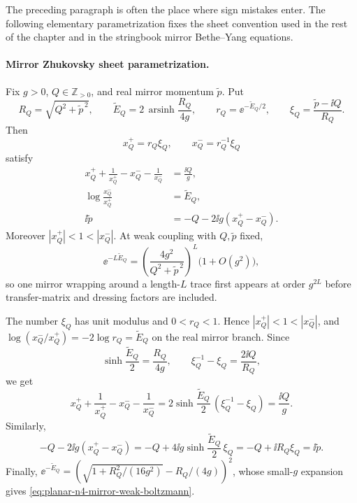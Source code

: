 The preceding paragraph is often the place where sign mistakes enter.  The
following elementary parametrization fixes the sheet convention used in the
rest of the chapter and in the stringbook mirror Bethe--Yang equations.

\paragraph{Mirror Zhukovsky sheet parametrization.}
Fix \(g>0\), \(Q\in\mathbb Z_{>0}\), and real mirror momentum
\(\widetilde p\).  Put
\[
  R_Q=\sqrt{Q^2+\widetilde p^{\,2}},
  \qquad
  \widetilde E_Q
  =
  2\,\operatorname{arsinh}\frac{R_Q}{4g},
  \qquad
  r_Q=\ee^{-\widetilde E_Q/2},
  \qquad
  \xi_Q=\frac{\widetilde p-\ii Q}{R_Q}.
\]
Then
\begin{equation}
  x_Q^+=r_Q\xi_Q,\qquad
  x_Q^-=r_Q^{-1}\xi_Q
  \label{eq:planar-n4-mirror-zhukovsky-parametrization}
\end{equation}
satisfy
\begin{align}
  x_Q^++\frac1{x_Q^+}-x_Q^- -\frac1{x_Q^-}
  &=
  \frac{\ii Q}{g},
  \label{eq:planar-n4-mirror-shortening-check}\\
  \log\frac{x_Q^-}{x_Q^+}
  &=
  \widetilde E_Q,
  \label{eq:planar-n4-mirror-energy-log-check}\\
  \ii\widetilde p
  &=
  -Q-2\ii g(x_Q^+-x_Q^-).
  \label{eq:planar-n4-mirror-momentum-check}
\end{align}
Moreover \(|x_Q^+|<1<|x_Q^-|\).  At weak coupling with \(Q,\widetilde p\)
fixed,
\begin{equation}
  \ee^{-L\widetilde E_Q}
  =
  \left(\frac{4g^2}{Q^2+\widetilde p^{\,2}}\right)^L
  \bigl(1+O(g^2)\bigr),
  \label{eq:planar-n4-mirror-weak-boltzmann}
\end{equation}
so one mirror wrapping around a length-\(L\) trace first appears at order
\(g^{2L}\) before transfer-matrix and dressing factors are included.

The number \(\xi_Q\) has unit modulus and \(0<r_Q<1\).  Hence
\(|x_Q^+|<1<|x_Q^-|\), and
\(\log(x_Q^-/x_Q^+)=-2\log r_Q=\widetilde E_Q\) on the real mirror branch.
Since
\[
  \sinh\frac{\widetilde E_Q}{2}=\frac{R_Q}{4g},
  \qquad
  \xi_Q^{-1}-\xi_Q=\frac{2\ii Q}{R_Q},
\]
we get
\[
  x_Q^++\frac1{x_Q^+}-x_Q^- -\frac1{x_Q^-}
  =
  2\sinh\frac{\widetilde E_Q}{2}\,(\xi_Q^{-1}-\xi_Q)
  =
  \frac{\ii Q}{g}.
  \]
Similarly,
\[
  -Q-2\ii g(x_Q^+-x_Q^-)
  =
  -Q+4\ii g\sinh\frac{\widetilde E_Q}{2}\,\xi_Q
  =
  -Q+\ii R_Q\xi_Q
  =
  \ii\widetilde p.
\]
Finally,
\(\ee^{-\widetilde E_Q}=(\sqrt{1+R_Q^2/(16g^2)}-R_Q/(4g))^2\), whose
small-\(g\) expansion gives \eqref{eq:planar-n4-mirror-weak-boltzmann}.

